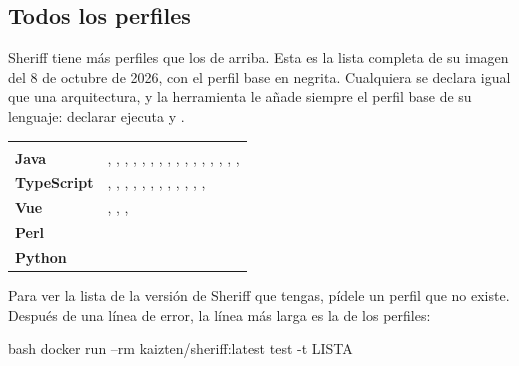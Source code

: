 \documentclass[11pt,a4paper]{article}
\begin{document}
\subsection{Todos los perfiles}

Sheriff tiene más perfiles que los de arriba. Esta es la lista completa de su
imagen del 8 de octubre de 2026, con el perfil base en negrita. Cualquiera se
declara igual que una arquitectura, y la herramienta le añade siempre el perfil
base de su lenguaje: declarar  ejecuta 
y .

\begin{center}
\begin{tabularx}{\linewidth}{@{\hspace{6pt}}>{\bfseries}p{20mm}L}
\headrow {} &  \\
Java & \textbf{}, , , , , , , , , , , , , , , ,  \\
TypeScript & \textbf{}, , , , , , , , , , , ,  \\
Vue & \textbf{}, , ,  \\
Perl & \textbf{} \\
Python & \textbf{} \\
\end{tabularx}
\end{center}

Para ver la lista de la versión de Sheriff que tengas, pídele un perfil que no
existe. Después de una línea de error, la línea  más
larga es la de los perfiles:

\begin{command}{bash}
docker run --rm kaizten/sheriff:latest test -t LISTA
\end{command}
\end{document}
